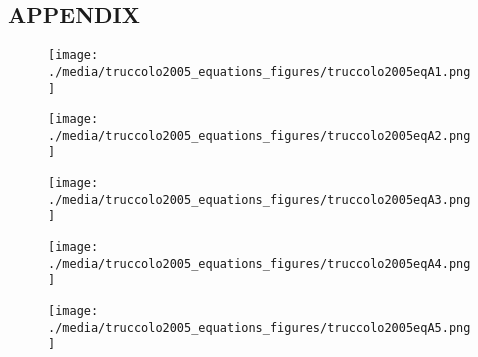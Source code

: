 \documentclass[svgnames,13pt]{beamer}
\begin{document}
\subsection{ APPENDIX}

\begin{frame}{}
\begin{figure}\centering\texttt{[image: ./media/truccolo2005\_equations\_figures/truccolo2005eqA1.png]}\\\end{figure}
\end{frame} 

\begin{frame}{}
\begin{figure}\centering\texttt{[image: ./media/truccolo2005\_equations\_figures/truccolo2005eqA2.png]}\\\end{figure}
\end{frame} 

\begin{frame}{}
\begin{figure}\centering\texttt{[image: ./media/truccolo2005\_equations\_figures/truccolo2005eqA3.png]}\\\end{figure}
\end{frame} 

\begin{frame}{}
\begin{figure}\centering\texttt{[image: ./media/truccolo2005\_equations\_figures/truccolo2005eqA4.png]}\\\end{figure}
\end{frame} 

\begin{frame}{}
\begin{figure}\centering\texttt{[image: ./media/truccolo2005\_equations\_figures/truccolo2005eqA5.png]}\\\end{figure}
\end{frame} 
\end{document}
